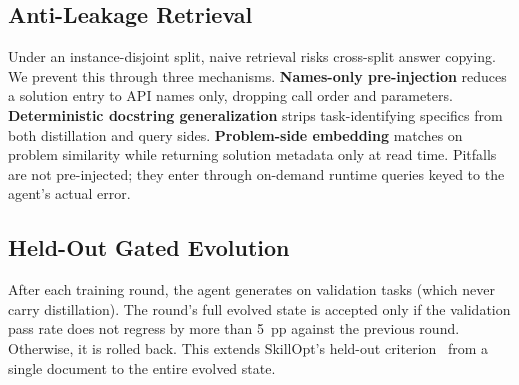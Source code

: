 \subsection{Anti-Leakage Retrieval}
\label{sec:se_read}

Under an instance-disjoint split, naive retrieval risks cross-split answer copying. We prevent this through three mechanisms. \textbf{Names-only pre-injection} reduces a solution entry to API names only, dropping call order and parameters. \textbf{Deterministic docstring generalization} strips task-identifying specifics from both distillation and query sides. \textbf{Problem-side embedding} matches on problem similarity while returning solution metadata only at read time. Pitfalls are not pre-injected; they enter through on-demand runtime queries keyed to the agent's actual error.

\subsection{Held-Out Gated Evolution}
\label{sec:se_loop}

After each training round, the agent generates on validation tasks (which never carry distillation). The round's full evolved state is accepted only if the validation pass rate does not regress by more than 5~pp against the previous round. Otherwise, it is rolled back. This extends SkillOpt's held-out criterion~\cite{yang2026skillopt} from a single document to the entire evolved state.
